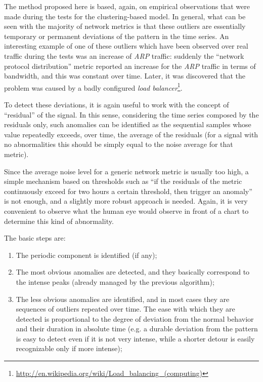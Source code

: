 \documentclass[12pt,a4paper,cucitura]{toptesi}
\begin{document}

The method proposed here is based, again, on empirical observations that were made during the tests for the clustering-based model. In general, what can be seen with the majority of network metrics is that these outliers are essentially temporary or permanent deviations of the pattern in the time series. An interesting example of one of these outliers which have been observed over real traffic during the tests was an increase of \emph{ARP} traffic: suddenly the ``network protocol distribution'' metric reported an increase for the \emph{ARP} traffic in terms of bandwidth, and this was constant over time. Later, it was discovered that the problem was caused by a badly configured \emph{load balancer}\footnote{\url{http://en.wikipedia.org/wiki/Load_balancing_(computing)}}.

To detect these deviations, it is again useful to work with the concept of ``residual'' of the signal. In this sense, considering the time series composed by the residuals only, such anomalies can be identified as the sequential samples whose value repeatedly exceeds, over time, the average of the residuals (for a signal with no abnormalities this should be simply equal to the noise average for that metric).

Since the average noise level for a generic network metric is usually too high, a simple mechanism based on thresholds such as ``if the residuals of the metric continuously exceed for two hours a certain threshold, then trigger an anomaly'' is not enough, and a slightly more robust approach is needed.
Again, it is very convenient to observe what the human eye would observe in front of a chart to determine this kind of abnormality. 

The basic steps are:

\begin{enumerate}

\item The periodic component is identified (if any);
\item The most obvious anomalies are detected, and they basically correspond to the intense peaks (already managed by the previous algorithm);
\item The less obvious anomalies are identified, and in most cases they are sequences of outliers repeated over time. The ease with which they are detected is proportional to the degree of deviation from the normal behavior and their duration in absolute time (e.g. a durable deviation from the pattern is easy to detect even if it is not very intense, while a shorter detour is easily recognizable only if more intense); 

\end{enumerate}
\end{document}
